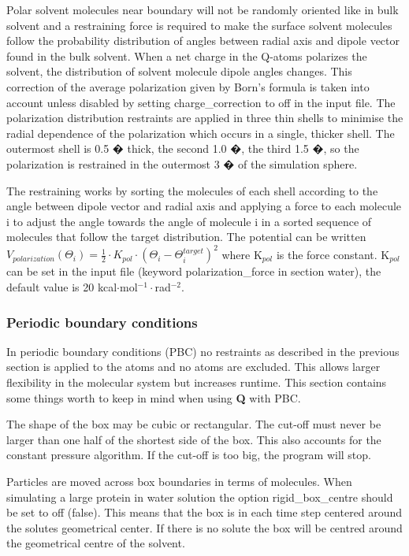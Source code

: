 \documentclass[a4paper,10pt]{article}
\begin{document}
Polar solvent molecules near boundary will not be randomly
oriented like in bulk solvent and a restraining force is required
to make the surface solvent molecules follow the probability
distribution of angles between radial axis and dipole vector found
in the bulk solvent. When a net charge in the Q-atoms polarizes
the solvent, the distribution of solvent molecule dipole angles
changes. This correction of the average polarization given by
Born's formula is taken into account unless disabled by setting
charge\_correction to off in the input file. The polarization
distribution restraints are applied in three thin shells to
minimise the radial dependence of the polarization which occurs in
a single, thicker shell. The outermost shell is 0.5 � thick, the
second 1.0 �, the third 1.5 �, so the polarization is restrained
in the outermost 3 � of the simulation sphere.

The restraining works by sorting the molecules of each shell
according to the angle between dipole vector and radial axis and
applying a force to each molecule i to adjust the angle towards
the angle of molecule i in a sorted sequence of molecules that
follow the target distribution. The potential can be written
$V_{polarization} \left(\Theta _i \right) = \frac{1}{2} \cdot
K_{pol} \cdot \left( \Theta _i - \Theta _i^{target} \right)^2$
where K$_{pol}$ is the force constant. K$_{pol}$ can be set in the
input file (keyword polarization\_force in section water), the
default value is 20 kcal$\cdot$mol$^{-1}\cdot$rad$^{-2}$.

\subsubsection{Periodic boundary conditions}
In periodic boundary conditions (PBC) no restraints as described
in the previous section is applied to the atoms and no atoms are
excluded. This allows larger flexibility in the molecular system
but increases runtime. This section contains some things worth to
keep in mind when using \textbf{Q} with PBC.

The shape of the box may be cubic or rectangular. The cut-off must
never be larger than one half of the shortest side of the box.
This also accounts for the constant pressure algorithm. If the
cut-off is too big, the program will stop.

Particles are moved across box boundaries in terms of molecules.
When simulating a large protein in water solution the option
rigid\_box\_centre should be set to off (false). This means that
the box is in each time step centered around the solutes
geometrical center. If there is no solute the box will be centred
around the geometrical centre of the solvent.
\end{document}
